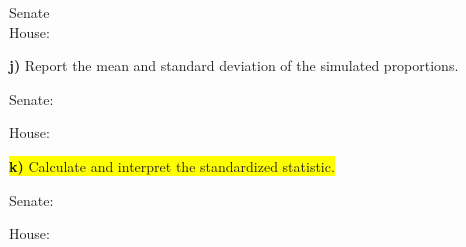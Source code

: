\documentclass{article}
\newif\ifPrintSolution
\newcommand{\sol}[1]{\ifPrintSolution {\color{blue} #1 } \fi}
\begin{document}
\vspace{0.1in}

\hspace{0.2in} Senate \sol{The p-value should be around 0.0290, which is strong evidence against the null hypothesis that the long run proportion of candidates that look more competent win their elections is 50$\%$} \\

\vspace{0.1in}
\hspace{0.2in}House: \sol{the p-value should be around (computationally) 0, which is very strong evidence against the null hypothesis that the long run proportion of candidates that look more competent win their elections is 50$\%$} 

\vspace{0.25in}

\hspace{0.1in} \textbf{j) }  Report the mean and standard deviation of the simulated proportions.

\vspace{0.1in}

\hspace{0.2in} Senate:  \sol{the mean should be about 0.5 with a SD about 0.088}\\

\vspace{0.1in}

\hspace{0.2in}  House: \sol{ The mean should be about 0.5 with a SD about 0.030}

\vspace{0.55in}


\hspace{0.1in} \colorbox{yellow}{\textbf{k) } Calculate and interpret the standardized statistic.}

\vspace{0.1in}

\hspace{0.2in} 	 Senate:  \sol{z $\approx$ 2.016129, Strong Evidence against the Null - it is 2.02 standard deviations from the null}\\

\vspace{0.1in}

\hspace{0.2in}  House: \sol{z $\approx$ 6.25, Very Strong Evidence against the Null - it is 6.25 standard deviations from the null}


\vspace{0.25in}
\end{document}
